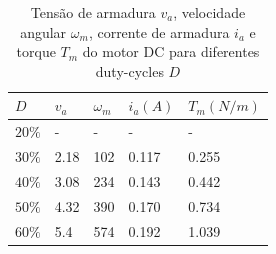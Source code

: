 \documentclass{article}
\begin{document}
\begin{table}[H]
	\centering
	\caption{Tensão de armadura $v_a$, velocidade angular $\omega_m$, corrente de armadura $i_a$ e torque $T_m$ do motor DC para diferentes duty-cycles $D$}
	\label{tab:vabuck}
	\begin{tabular}{|l|l|l|l|l|}
		\hline
		$D$    & $v_a$ & $\omega_m$ & $i_a (A)$ & $T_m (N/m)$ \\ \hline
		$20\%$ & -     & -          & -         & -           \\ \hline
		$30\%$ & 2.18  & 102        & 0.117     & 0.255       \\ \hline
		$40\%$ & 3.08  & 234        & 0.143     & 0.442       \\ \hline
		$50\%$ & 4.32  & 390        & 0.170     & 0.734       \\ \hline
		$60\%$ & 5.4   & 574        & 0.192     & 1.039       \\ \hline
	\end{tabular}
\end{table}
\end{document}
